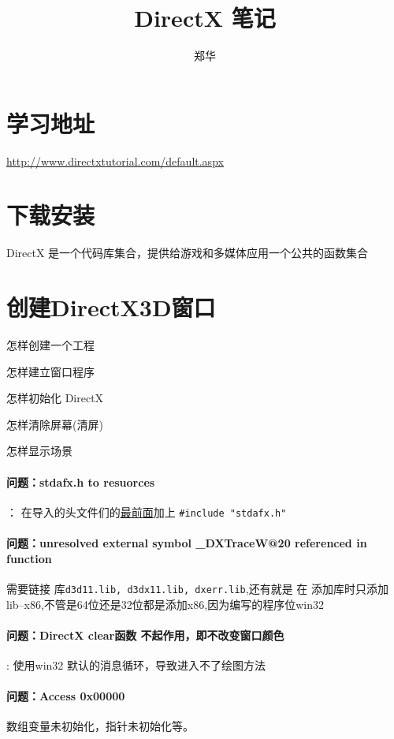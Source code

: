\documentclass[UTF8,a4paper,8pt]{ctexart}
\author{\kaishu 郑华}
\title{DirectX 笔记}
\begin{document}
 
 	\maketitle
	\tableofcontents
\newpage
\section{学习地址}\url{http://www.directxtutorial.com/default.aspx}
 
\section{下载安装}
  DirectX 是一个代码库集合，提供给游戏和多媒体应用一个公共的函数集合
  
\section{创建DirectX3D窗口}
 
	 怎样创建一个工程
	 
	 怎样建立窗口程序
	 
	 怎样初始化 DirectX
	 
	 怎样清除屏幕(清屏)
	 
	 怎样显示场景
 
	 \paragraph{问题：stdafx.h  to resuorces }：
		 在导入的头文件们的\underline{最前面}加上
		 \verb|#include "stdafx.h"|
	 \paragraph{问题：unresolved external symbol \_DXTraceW@20 referenced in function}
		 需要链接 库\verb|d3d11.lib, d3dx11.lib, dxerr.lib|,还有就是
		 在 添加库时只添加 lib--x86,不管是64位还是32位都是添加x86,因为编写的程序位win32
 
	 \paragraph{问题：DirectX clear函数 不起作用，即不改变窗口颜色}:
		 使用win32 默认的消息循环，导致进入不了绘图方法
	 
	 \paragraph{问题：Access 0x00000} 
		 数组变量未初始化，指针未初始化等。
 
\end{document}
